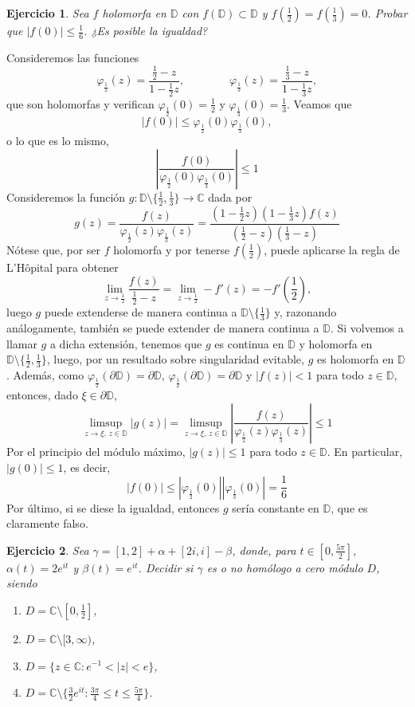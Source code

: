 \documentclass[11pt]{report}
\makeatletter
\renewenvironment{proof}[1][\proofname]{\par
  \pushQED{\qed}%
  \normalfont \topsep\z@skip %
  \trivlist
  \item[\hskip\labelsep
        \itshape
    #1\@addpunct{.}]\ignorespaces
}{%
  \popQED\endtrivlist\@endpefalse
}
\newcommand{\C}{\mathbb C}
\newcommand{\D}{\mathbb D}
\newtheorem{ejercicio}{Ejercicio}
\makeatother
\begin{document}
\begin{ejercicio}
  Sea $f$ holomorfa en $\D$ con $f(\D) \subset \D$ y $f(\frac{1}{2}) = f(\frac{1}{3})=0$. Probar que $|f(0)| \leq \frac{1}{6}$. ¿Es posible la igualdad?
\end{ejercicio}

\begin{proof}
Consideremos las funciones
\[\varphi_{\frac{1}{2}}(z) = \frac{\frac{1}{2}-z}{1-\frac{1}{2}z}, \qquad \qquad \varphi_{\frac{1}{3}}(z) = \frac{\frac{1}{3}-z}{1-\frac{1}{3}z} ,\]
que son holomorfas y verifican $\varphi_{\frac{1}{2}}(0)=\frac{1}{2}$ y $\varphi_{\frac{1}{3}}(0)=\frac{1}{3}$. Veamos que
\[|f(0)| \leq \varphi_{\frac{1}{2}}(0)\varphi_{\frac{1}{3}}(0),\]
o lo que es lo mismo,
\[\left|\frac{f(0)}{\varphi_{{\frac{1}{2}}}(0)\varphi_{{\frac{1}{3}}}(0)}\right| \leq 1\]
Consideremos la función $g \colon \D \setminus \{\frac{1}{2},\frac{1}{3}\} \to \C$ dada por
\[g(z)=\frac{f(z)}{\varphi_{\frac{1}{2}}(z)\varphi_{\frac{1}{3}}(z)} = \frac{(1-\frac{1}{2}z)(1-\frac{1}{3}z)f(z)}{(\frac{1}{2}-z)(\frac{1}{3}-z)}\]
Nótese que, por ser $f$ holomorfa y por tenerse $f(\frac{1}{2})$, puede aplicarse la regla de L'Hôpital para obtener
\[\lim_{z \to \frac{1}{2}}\frac{f(z)}{\frac{1}{2}-z} = \lim_{z \to \frac{1}{2}}-f'(z) = -f'\left(\frac{1}{2}\right),\]
luego $g$ puede extenderse de manera continua a $\D \setminus \{\frac{1}{3}\}$ y, razonando análogamente, también se puede extender de manera continua a $\D$. Si volvemos a llamar $g$ a dicha extensión, tenemos que $g$ es continua en $\D$ y holomorfa en $\D \setminus \{\frac{1}{2},\frac{1}{3}\}$, luego, por un resultado sobre singularidad evitable, $g$ es holomorfa en $\D$. Además, como $\varphi_{\frac{1}{2}}(\partial \D) = \partial \D$, $\varphi_{\frac{1}{2}}(\partial \D) = \partial \D$ y $|f(z)| < 1$ para todo $z \in \D$, entonces, dado $\xi \in \partial \D$,
\[\limsup_{z \to \xi, \, z \in \D} |g(z)| = \limsup_{z \to \xi, \, z \in \D}\left|\frac{f(z)}{\varphi_{\frac{1}{2}}(z)\varphi_{\frac{1}{3}}(z)}\right| \leq 1\]
Por el principio del módulo máximo, $|g(z)| \leq 1$ para todo $z \in \D$. En particular, $|g(0)|\leq 1$, es decir,
\[|f(0)| \leq |\varphi_{\frac{1}{2}}(0)| |\varphi_{\frac{1}{3}}(0)| = \frac{1}{6}\]
Por último, si se diese la igualdad, entonces $g$ sería constante en $\D$, que es claramente falso.
\end{proof}

\begin{ejercicio}
  Sea $\gamma = [1,2] + \alpha + [2i,i] - \beta$, donde, para $t \in [0,\frac{5\pi}{2}]$, $\alpha(t)=2e^{it}$ y $\beta(t)=e^{it}$. Decidir si $\gamma$ es o no homólogo a cero módulo $D$, siendo
    \begin{enumerate}
      \item $D = \C \setminus [0,\frac{1}{2}]$,
      \item $D = \C \setminus [3,\infty)$,
      \item $D = \{z \in \C \colon e^{-1} < |z| < e\}$,
      \item $D = \C \setminus \{\frac{3}{2}e^{it} \colon \frac{3\pi}{4} \leq t \leq \frac{5\pi}{4}\}$.
    \end{enumerate}
\end{ejercicio}
\end{document}
